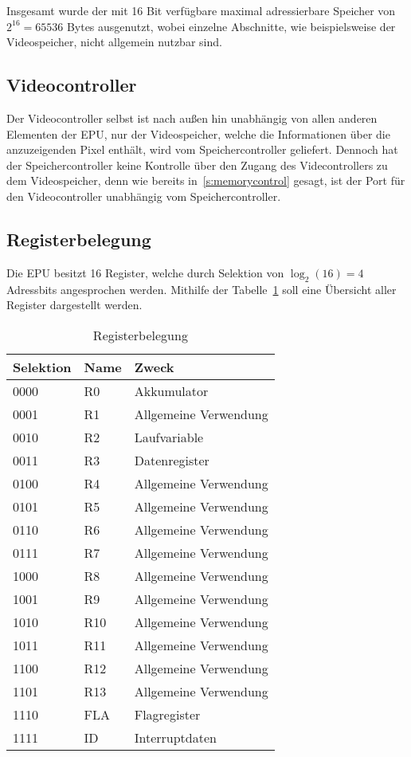 Insgesamt wurde der mit 16 Bit verfügbare maximal adressierbare Speicher von
$2^{16} = 65536$ Bytes ausgenutzt, wobei einzelne Abschnitte, wie beispielsweise
der Videospeicher, nicht allgemein nutzbar sind.
\subsection{Videocontroller}
\label{s:videocontrol}
Der Videocontroller selbst ist nach außen hin unabhängig von allen anderen
Elementen der \ac{EPU}, nur der Videospeicher, welche die Informationen über die
anzuzeigenden Pixel enthält, wird vom Speichercontroller geliefert. Dennoch hat
der Speichercontroller keine Kontrolle über den Zugang des Videcontrollers zu
dem Videospeicher, denn wie bereits in~\ref{s:memorycontrol} gesagt, ist der
Port für den Videocontroller unabhängig vom Speichercontroller.
\pagebreak
\subsection{Registerbelegung}
Die \ac{EPU} besitzt 16 Register, welche durch Selektion von $\log_2(16) = 4$
Adressbits angesprochen werden. Mithilfe der Tabelle~\ref{tab:registerbelegung}
soll eine Übersicht aller Register dargestellt werden.

\begin{table}[h]
\centering
\begin{tabular}{lll}
\toprule
Selektion & Name & Zweck\\
\midrule
0000 & R0  & Akkumulator\\
0001 & R1  & Allgemeine Verwendung\\
0010 & R2  & Laufvariable\\
0011 & R3  & Datenregister\\
0100 & R4  & Allgemeine Verwendung\\
0101 & R5  & Allgemeine Verwendung\\
0110 & R6  & Allgemeine Verwendung\\
0111 & R7  & Allgemeine Verwendung\\
1000 & R8  & Allgemeine Verwendung\\
1001 & R9  & Allgemeine Verwendung\\
1010 & R10 & Allgemeine Verwendung\\
1011 & R11 & Allgemeine Verwendung\\
1100 & R12 & Allgemeine Verwendung\\
1101 & R13 & Allgemeine Verwendung\\
1110 & FLA & Flagregister\\
1111 & ID  & Interruptdaten\\
\bottomrule
\end{tabular}
\caption{Registerbelegung}
\label{tab:registerbelegung}
\end{table}
\pagebreak
